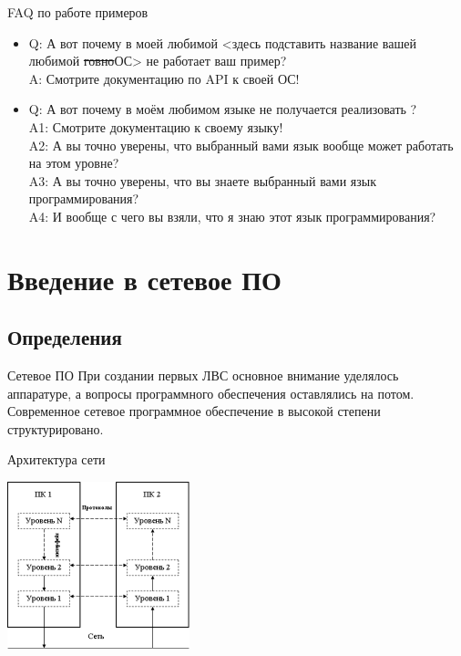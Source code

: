 \begin{frame}{FAQ по работе примеров}
	\begin{itemize}
		\item Q: А вот почему в моей любимой {\footnotesize <здесь подставить название вашей любимой \sout{говно}ОС>} не работает ваш пример?\\
	A: Смотрите документацию по API к своей ОС!
		\item Q: А вот почему в моём любимом языке {\footnotesize <здесь подставить название вашего любимого языка>} не получается реализовать {\footnotesize <здесь подставить название фичи, которую не получается использовать>}?\\
	A1: Смотрите документацию к своему языку!\\
	A2: А вы точно уверены, что выбранный вами язык вообще может работать на этом уровне?\\
	A3: А вы точно уверены, что вы знаете выбранный вами язык программирования?\\
	A4: И вообще с чего вы взяли, что я знаю этот язык программирования?
	\end{itemize}
\end{frame}

\section{Введение в сетевое ПО}
\subsection{Определения}

\begin{frame}{Сетевое ПО}
	При создании первых ЛВС основное внимание уделялось аппаратуре,  а вопросы программного обеспечения оставлялись на потом.
	Современное сетевое программное обеспечение в высокой степени структурировано.
\end{frame}

\begin{frame}{Архитектура сети}
	\begin{center}
	\includegraphics[width=200px]{01-proto_interface.png}
	\end{center}
\end{frame}

